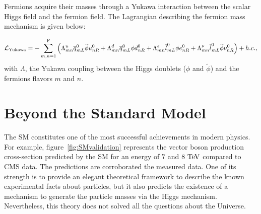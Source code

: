       Fermions acquire their masses through a Yukawa interaction between the scalar Higgs field and the fermion field.
      The Lagrangian describing the fermion mass mechanism is given below:

      \begin{equation}
        \mathcal{L}_{\rm{Yukawa}} = - \sum^{\rm{F}}_{m,n = 1} \left( \Lambda^{u}_{mn} \overline{q}^0_{mL} \widetilde{\phi} u^{0}_{nR} + \Lambda^{d}_{mn} \overline{q}^{0}_{mL} \phi d^{0}_{nR} + \Lambda^{e}_{mn} \overline{l}^{0}_{mL} \phi e^{0}_{nR} + \Lambda^{\nu}_{mn} \overline{l}^{0}_{mL} \widetilde{\phi} \nu^{0}_{nR} \right) + h.c., 
      \end{equation}
      with $\Lambda$, the Yukawa coupling between the Higgs doublets ($\phi$ and $\widetilde{\phi}$) and the fermions flavors $m$ and $n$.

  \section{Beyond the Standard Model}

  The \gls{SM} constitutes one of the most successful achievements in modern physics.
  For example, figure~\ref{fig:SMvalidation} represents the vector boson production cross-section predicted by the \gls{SM} for an energy of $7$ and $8~\rm{TeV}$ compared to CMS data.
  The predictions are corroborated the measured data.
  One of its strength is to provide an elegant theoretical framework to describe the known experimental facts about particles, but it also predicts the existence of a mechanism to generate the particle masses via the Higgs mechanism.
  Nevertheless, this theory does not solved all the questions about the Universe.

